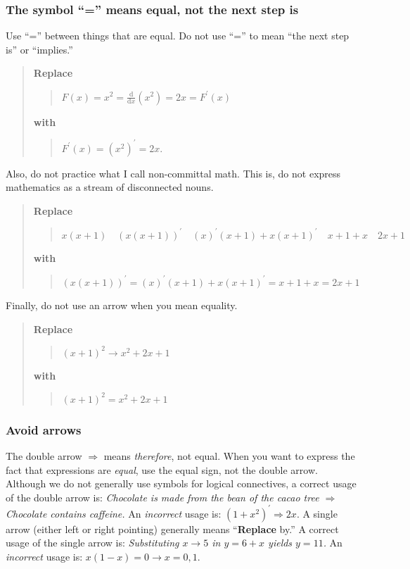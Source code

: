 \documentclass[12pt]{article}
\newcounter{ex}\setcounter{ex}{0}
\newcounter{id}\setcounter{id}{0}
\newcounter{se}\setcounter{se}{0}
\begin{document}
 \subsubsection{ The symbol ``='' means equal, not the next step is}

Use ``='' between things that are equal. Do not use ``='' to  mean ``the next step is'' or ``implies.''

\begin{quote}
\textbf{Replace}
\begin{quote}
  \(\displaystyle F(x) = x^2 = \frac{\mathrm{d}}{\mathrm{d} x} (x^2) = 2x = F^\prime(x)\)
\end{quote}
\textbf{with}
\begin{quote}
  \(F^\prime(x) = (x^2)^\prime = 2 x. \)
\end{quote}
\end{quote}

\noindent Also, do not practice what I call non-committal math. This is, do not
express mathematics as a stream of disconnected nouns.

\begin{quote}
\textbf{Replace}
\begin{quote}
  \( x (x + 1) \quad (x (x + 1))^\prime \quad (x)^\prime (x + 1) + x (x+1)^\prime
 \quad x + 1 + x \quad 2x + 1 \)
\end{quote}
\textbf{with}
\begin{quote}
   \((x (x + 1))^\prime = (x)^\prime (x + 1) + x (x+1)^\prime =  x + 1 + x = 2x + 1 \)
\end{quote}
\end{quote}

Finally, do not use an arrow when you mean equality.

\begin{quote}
\textbf{Replace}
\begin{quote}
  \( (x+1)^2 \rightarrow x^2 + 2 x + 1 \)
\end{quote}
\textbf{with}
\begin{quote}
   \( (x+1)^2 = x^2 + 2 x + 1 \)
\end{quote}
\end{quote}

 \subsubsection{ Avoid arrows}
The double arrow \(\Rightarrow\) means \emph{therefore}, not
equal. When you want to express the fact that expressions are
\emph{equal}, use the equal sign, not the double arrow. Although we do
not generally use symbols for logical connectives, a correct usage of
the double arrow is: \emph{Chocolate is made from the bean of the
cacao tree \(\Rightarrow\) Chocolate contains caffeine.}  An
\emph{incorrect} usage is: \(\left(1 + x^2\right)^\prime \Rightarrow 2
x\).  A single arrow (either left or right pointing) generally means
``\textbf{Replace} by.''  A correct usage of the single arrow is:
\emph{Substituting \(x \to 5\) in \(y = 6 + x\) yields \(y = 11\).} An
\emph{incorrect} usage is: \(x (1-x) = 0 \to x = 0,1\).
\end{document}
